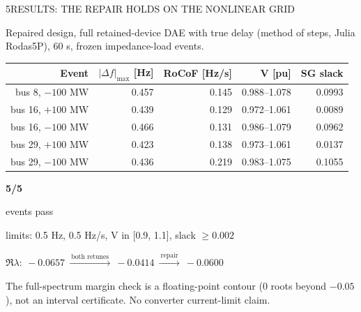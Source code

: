 \begin{minipage}[t][\PosterMiddleRowHeight][t]{\PosterHalfWidth}\vspace{0pt}
  \begin{PosterPanel}{\PosterMiddleRowHeight}{5}{RESULTS: THE REPAIR HOLDS ON THE NONLINEAR GRID}

    {\FigureSize Repaired design, full retained-device DAE with true delay (method of steps, Julia Rodas5P), 60 s, frozen impedance-load events.\par}
    \vspace{1mm}
    \noindent\begin{minipage}[c]{292mm}
      \begin{center}\FigureSize\renewcommand{\arraystretch}{1.25}
      \begin{tabular}{rrrrr}
      \textbf{Event} & \textbf{$|\Delta f|_{\max}$ [Hz]} & \textbf{RoCoF [Hz/s]} & \textbf{V [pu]} & \textbf{SG slack}\\\hline
      bus 8, $-100$ MW  & 0.457 & 0.145 & 0.988--1.078 & 0.0993\\
      bus 16, $+100$ MW & 0.439 & 0.129 & 0.972--1.061 & 0.0089\\
      bus 16, $-100$ MW & 0.466 & 0.131 & 0.986--1.079 & 0.0962\\
      bus 29, $+100$ MW & 0.423 & 0.138 & 0.973--1.061 & 0.0137\\
      bus 29, $-100$ MW & 0.436 & 0.219 & 0.983--1.075 & 0.1055\\
      \end{tabular}\end{center}
    \end{minipage}\hfill%
    \begin{minipage}[c]{122mm}\raggedright
      {\PosterCondensed\bfseries\fontsize{62pt}{66pt}\selectfont\color{IASBlue}5/5\par}
      {\PosterParagraph events pass\par}\vspace{2mm}
      {\FigureSize limits: 0.5 Hz, 0.5 Hz/s, V in [0.9, 1.1], slack $\ge0.002$\par}
    \end{minipage}\par
    \vspace{2mm}
    {\EquationSize\color{IASBlue}$\Re\lambda:\ -0.0657\ \xrightarrow{\ \text{both retunes}\ }\ -0.0414\ \xrightarrow{\ \text{repair}\ }\ -0.0600$\par}
    \vspace{2mm}
    {\FigureSize The full-spectrum margin check is a floating-point contour (0 roots beyond $-0.05$), not an interval certificate. No converter current-limit claim.}

  \end{PosterPanel}
\end{minipage}%
